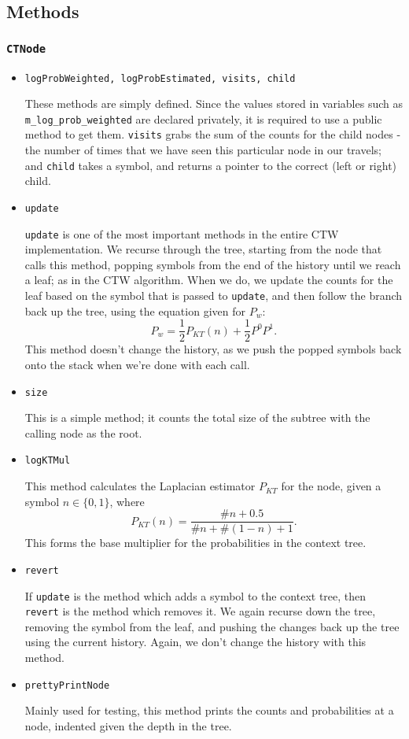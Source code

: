 \documentclass[pdftex,twoside,a4paper]{report}
\begin{document}
\subsection{Methods}
\subsubsection{\texttt{CTNode}}
\begin{itemize}
\item{\texttt{logProbWeighted, logProbEstimated, visits, child}

    These methods are simply defined. Since the values stored in variables such as \texttt{m\_log\_prob\_weighted} are declared privately, it is required to use a public method to get them. \texttt{visits} grabs the sum of the counts for the child nodes - the number of times that we have seen this particular node in our travels; and \texttt{child} takes a symbol, and returns a pointer to the correct (left or right) child.
}
\item{\texttt{update}

    \texttt{update} is one of the most important methods in the entire CTW implementation. We recurse through the tree, starting from the node that calls this method, popping symbols from the end of the history until we reach a leaf; as in the CTW algorithm. When we do, we update the counts for the leaf based on the symbol that is passed to \texttt{update}, and then follow the branch back up the tree, using the equation given for $P_{w}$: \[ P_{w} = \frac{1}{2}P_{KT}(n) + \frac{1}{2}P^{0}P^{1}. \] %
This method doesn't change the history, as we push the popped symbols back onto the stack when we're done with each call.
  }
\item{\texttt{size}
    
    This is a simple method; it counts the total size of the subtree with the calling node as the root. 
  }
\item{\texttt{logKTMul}
    
    This method calculates the Laplacian estimator $P_{KT}$ for the node, given a symbol $n \in \{0,1\}$, where \[ P_{KT}(n) = \frac{\#n + 0.5}{\#n + \#(1-n) + 1}.\] This forms the base multiplier for the probabilities in the context tree.
  }
\item{\texttt{revert}
    
    If \texttt{update} is the method which adds a symbol to the context tree, then \texttt{revert} is the method which removes it. We again recurse down the tree, removing the symbol from the leaf, and pushing the changes back up the tree using the current history. Again, we don't change the history with this method.
  }
\item{\texttt{prettyPrintNode}
    
    Mainly used for testing, this method prints the counts and probabilities at a node, indented given the depth in the tree.
  }
\end{itemize}
\end{document}
